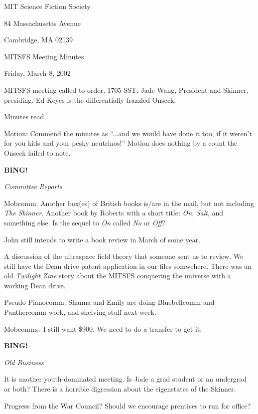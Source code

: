 \documentclass[12pt]{article}
\newcommand{\bing}{{\bf BING!} }
\newcommand{\goto}[1]{\bing \vskip 12pt \centerline{{\em{#1}}}}
\begin{document}
\begin{center}

MIT Science Fiction Society 

84 Massachusetts Avenue

Cambridge, MA 02139

\vspace{12pt}

MITSFS Meeting Minutes 

Friday, March 8, 2002

\end{center}
 
\vspace{18pt}

\setlength{\parskip}{6pt}

\noindent
MITSFS meeting called to order, 1705 SST, Jade Wang, President and
Skinner, presiding.  Ed Keyes is the differentially frazzled Onseck.

Minutes read.

Motion: Commend the minutes as ``...and we would have done it too,
if it weren't for you kids and your pesky neutrinos!''  Motion does
nothing by a count the Onseck failed to note.

\goto{Committee Reports}

Mobcomm: Another box(es) of British books is/are in the mail, but
not including {\em The Skinner}.  Another book by Roberts with a
short title: {\em On}, {\em Salt}, and something else.  Is the
sequel to {\em On} called {\em No} or {\em Off}?

John still intends to write a book review in March of some year.

A discussion of the ultraspace field theory that someone sent us to
review.  We still have the Dean drive patent application in our
files somwehere.  There was an old {\em Twilight Zine} story about
the MITSFS conquering the universe with a working Dean drive.

Pseudo-Pianocomm: Shanna and Emily are doing Bluebellcomm and
Panthercomm work, and shelving stuff next week.

Mobcomm$_2$: I still want \$900.  We need to do a transfer to get it.

\goto{Old Business}

It is another youth-dominated meeting.  Is Jade a grad student or an
undergrad or both?  There is a horrible digression about the eigenstates
of the Skinner.

Progress from the War Council?  Should we encourage prentices to run
for office?
\end{document}
